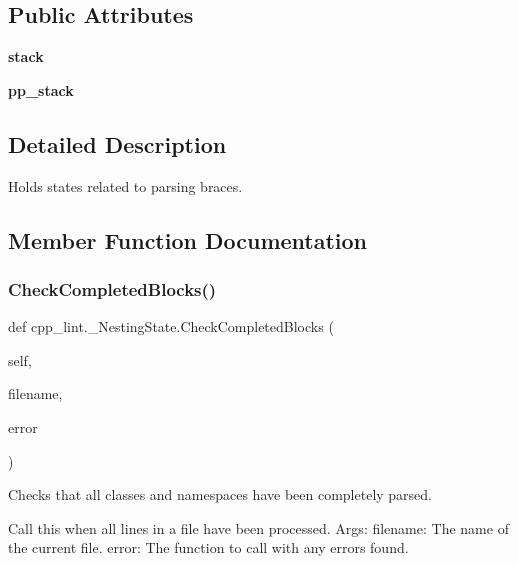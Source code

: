 \subsection*{Public Attributes}
\begin{DoxyCompactItemize}
\item 
\mbox{\label{classcpp__lint_1_1___nesting_state_a616d83d8f9736ced48818a12d256bf82}} 
{\bfseries stack}
\item 
\mbox{\label{classcpp__lint_1_1___nesting_state_a901e56e3cc366e59cfe405f255be4ded}} 
{\bfseries pp\+\_\+stack}
\end{DoxyCompactItemize}


\subsection{Detailed Description}
\begin{DoxyVerb}Holds states related to parsing braces.\end{DoxyVerb}
 

\subsection{Member Function Documentation}
\mbox{\label{classcpp__lint_1_1___nesting_state_acacead3c8a88971753e46ac7a054e98f}} 
\subsubsection{\texorpdfstring{Check\+Completed\+Blocks()}{CheckCompletedBlocks()}}
{\footnotesize\ttfamily def cpp\+\_\+lint.\+\_\+\+Nesting\+State.\+Check\+Completed\+Blocks (\begin{DoxyParamCaption}\item[{}]{self,  }\item[{}]{filename,  }\item[{}]{error }\end{DoxyParamCaption})}

\begin{DoxyVerb}Checks that all classes and namespaces have been completely parsed.

Call this when all lines in a file have been processed.
Args:
  filename: The name of the current file.
  error: The function to call with any errors found.
\end{DoxyVerb}
 \mbox{\label{classcpp__lint_1_1___nesting_state_a8add51b250bd6004e4bb25669d274c3f}} 

